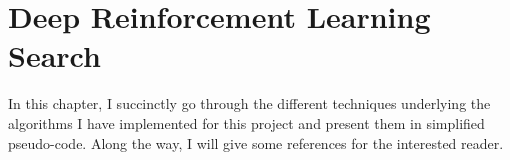 
\chapter{Deep Reinforcement Learning Search} %

\label{Chapter1} %

In this chapter, I succinctly go through the different techniques underlying the algorithms I have implemented for this project and present them in simplified pseudo-code. Along the way, I will give some references for the interested reader.




\label{GSH}
\label{sec:TheoryBFSDFS}
\label{sec:TheoryAStar}

